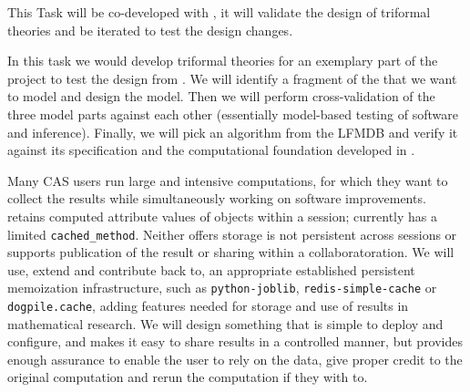 \begin{workpackage}[id=dksbases,wphases=1-48!.5,
  title=Data/Knowledge/Software-Bases,lead=JU,
  ZHRM=12,JURM=36,USHRM=12,UWRM=25,SARM=10,LLRM=2,PSRM=4]
\begin{tasklist}
\begin{task}[title=FindStat Case Study (triformal theories),id=data-findstat,
  lead=JU,partners={ZH}]
  This Task will be co-developed with , it will validate
  the design of triformal theories and be iterated to test the design changes.
\end{task}

\begin{task}[title=\LMFDB Case study (triformal theories),id=data-LMFDB,
  lead=JU,partners={ZH,UW}]
  In this task we would develop triformal theories for an exemplary part of the \LMFDB
  project to test the design from .  We will identify a
  fragment of the \LMFDB that we want to model and design the model. Then we will perform
  cross-validation of the three model parts against each other (essentially model-based
  testing of software and inference). Finally, we will pick an algorithm from the LFMDB
  and verify it against its specification and the computational foundation developed in
  . 
  \end{task}

\begin{task}[title=Memoization and production of new data,id=data-memo,
  lead=SA,partners={US,PS,UW}]
  Many CAS users run large and intensive computations, for which they want to collect the
  results while simultaneously working on software improvements. \GAP
  retains computed attribute values of objects within a session; \Sage currently has a
  limited \lstinline{cached_method}. Neither offers storage is not persistent across sessions or
  supports publication of the result or sharing within a collaboratoration. We
  will use, extend and contribute back to, an appropriate established persistent memoization
  infrastructure, such as \texttt{python-joblib}, \texttt{redis-simple-cache} or
  \texttt{dogpile.cache}, adding features needed for storage and use
  of results in mathematical research. We will design something that
  is simple to deploy and configure, and makes it easy to share
  results in a controlled manner, but provides enough assurance to
  enable the user to rely on the data, give proper credit to the
  original computation and rerun the computation if they with to.

\end{task}
\end{tasklist}


\end{workpackage}
